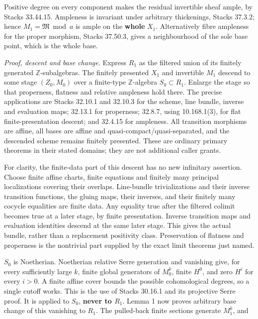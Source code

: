 \documentclass[
  11pt,
]{article}
\begin{document}
Positive degree on every component makes the residual invertible sheaf
ample, by Stacks 33.44.15. Ampleness is invariant under arbitrary
thickenings, Stacks 37.3.2; hence \(M_1=\mathfrak M\bmod a\) is ample on
the \textbf{whole} \(X_1\). Alternatively fibre ampleness for the proper
morphism, Stacks 37.50.3, gives a neighbourhood of the sole base point,
which is the whole base.

\emph{Proof, descent and base change.} Express \(R_1\) as the filtered
union of its finitely generated \(\mathbb Z\)-subalgebras. The finitely
presented \(X_1\) and invertible \(M_1\) descend to some stage
\((Z_0,M_0)\) over a finite-type \(\mathbb Z\)-algebra
\(S_0\subset R_1\). Enlarge the stage so that properness, flatness and
relative ampleness hold there. The precise applications are Stacks
32.10.1 and 32.10.3 for the scheme, line bundle, inverse and evaluation
maps; 32.13.1 for properness; 32.8.7, using 10.168.1(3), for flat
finite-presentation descent; and 32.4.15 for ampleness. All transition
morphisms are affine, all bases are affine and
quasi-compact/quasi-separated, and the descended scheme remains finitely
presented. These are ordinary primary theorems in their stated domains;
they are not additional caller grants.

For clarity, the finite-data part of this descent has no new infinitary
assertion. Choose finite affine charts, finite equations and finitely
many principal localizations covering their overlaps. Line-bundle
trivializations and their inverse transition functions, the gluing maps,
their inverses, and their finitely many cocycle equalities are finite
data. Any equality true after the filtered colimit becomes true at a
later stage, by finite presentation. Inverse transition maps and
evaluation identities descend at the same later stage. This gives the
actual bundle, rather than a replacement positivity class. Preservation
of flatness and properness is the nontrivial part supplied by the exact
limit theorems just named.

\(S_0\) is Noetherian. Noetherian relative Serre generation and
vanishing give, for every sufficiently large \(k\), finite global
generators of \(M_0^k\), finite \(H^0\), and zero \(H^i\) for every
\(i>0\). A finite affine cover bounds the possible cohomological
degrees, so a single cutoff works. This is the use of Stacks 30.16.1 and
its projective Serre proof. It is applied to \(S_0\), \textbf{never to
\(R_1\)}. Lemma 1 now proves arbitrary base change of this vanishing to
\(R_1\). The pulled-back finite sections generate \(M_1^k\), and
\end{document}
